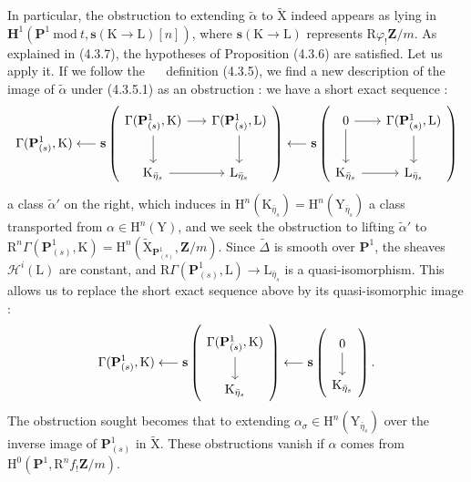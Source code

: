 \documentclass[11pt,leqno]{article}
\newcommand{\Page}[1]{\ifvmode\noindent\else\unskip\ \fi{\footnotesize\textcolor{gray}{[p.\,#1]}}\ \ignorespaces}
\begin{document}
In particular, the obstruction to extending \(\widetilde{\alpha}\) to \(\widetilde{\mathrm{X}}\) indeed appears as lying in \(\mathbf{H}^1(\mathbf{P}^1\ \mathrm{mod}\ t,\mathbf{s}(\mathrm{K}\to\mathrm{L})[n])\), where \(\mathbf{s}(\mathrm{K}\to\mathrm{L})\) represents \(\mathrm{R}\varphi_!\mathbf{Z}/m\). As explained in (4.3.7), the hypotheses of Proposition (4.3.6) are satisfied. Let us apply it. If we follow the
\Page{226}
definition (4.3.5), we find a new description of the image of \(\widetilde{\alpha}\) under (4.3.5.1) as an obstruction : we have a short exact sequence :
\[
\Gamma(\mathbf{P}^1_{(s)},\mathrm{K})
\longleftarrow
\mathbf{s}\left(
\begin{tikzcd}[ampersand replacement=\&, column sep=1.5em, row sep=2.2em]
\Gamma(\mathbf{P}^1_{(s)},\mathrm{K}) \arrow[r] \arrow[d]
  \& \Gamma(\mathbf{P}^1_{(s)},\mathrm{L}) \arrow[d] \\
\mathrm{K}_{\bar{\eta}_s} \arrow[r]
  \& \mathrm{L}_{\bar{\eta}_s}
\end{tikzcd}
\right)
\longleftarrow
\mathbf{s}\left(
\begin{tikzcd}[ampersand replacement=\&, column sep=1.5em, row sep=2.2em]
0 \arrow[r] \arrow[d]
  \& \Gamma(\mathbf{P}^1_{(s)},\mathrm{L}) \arrow[d] \\
\mathrm{K}_{\bar{\eta}_s} \arrow[r]
  \& \mathrm{L}_{\bar{\eta}_s}
\end{tikzcd}
\right)
\]
a class \(\widetilde{\alpha}'\) on the right, which induces in \(\mathrm{H}^n(\mathrm{K}_{\bar{\eta}_s})=\mathrm{H}^n(\mathrm{Y}_{\bar{\eta}_s})\) a class transported from \(\alpha\in\mathrm{H}^n(\mathrm{Y})\), and we seek the obstruction to lifting \(\widetilde{\alpha}'\) to \(\mathrm{R}^n\Gamma(\mathbf{P}^1_{(s)},\mathrm{K})=\mathrm{H}^n(\widetilde{\mathrm{X}}_{\mathbf{P}^1_{(s)}},\mathbf{Z}/m)\). Since \(\widetilde{\Delta}\) is smooth over \(\mathbf{P}^1\), the sheaves \(\mathscr{H}^i(\mathrm{L})\) are constant, and \(\mathrm{R}\Gamma(\mathbf{P}^1_{(s)},\mathrm{L})\to\mathrm{L}_{\bar{\eta}_s}\) is a quasi-isomorphism. This allows us to replace the short exact sequence above by its quasi-isomorphic image :
\[
\Gamma(\mathbf{P}^1_{(s)},\mathrm{K})
\longleftarrow
\mathbf{s}\left(
\begin{tikzcd}[ampersand replacement=\&, row sep=1.8em]
\Gamma(\mathbf{P}^1_{(s)},\mathrm{K}) \arrow[d] \\
\mathrm{K}_{\bar{\eta}_s}
\end{tikzcd}
\right)
\longleftarrow
\mathbf{s}\left(
\begin{tikzcd}[ampersand replacement=\&, row sep=1.8em]
0 \arrow[d] \\
\mathrm{K}_{\bar{\eta}_s}
\end{tikzcd}
\right).
\]
The obstruction sought becomes that to extending \(\alpha_\sigma\in\mathrm{H}^n(\mathrm{Y}_{\bar{\eta}_s})\) over the inverse image of \(\mathbf{P}^1_{(s)}\) in \(\widetilde{\mathrm{X}}\). These obstructions vanish if \(\alpha\) comes from \(\mathrm{H}^0(\mathbf{P}^1,\mathrm{R}^nf_!\mathbf{Z}/m)\).
\end{document}
